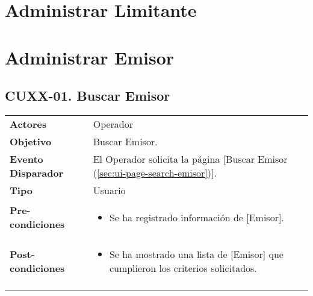 	\section{Administrar Limitante} \label{sec:cf-uc-admin-limitante}
	
	\clearpage
	\section{Administrar Emisor} \label{sec:cf-uc-admin-emisor}
	
	\subsection{CUXX-01. Buscar Emisor} \label{sec:cu-search-Emisor}
	
	\begin{tabular}{ p{3.5cm} p{11.5cm} }
		\textbf{Actores} & Operador\\
		\textbf{Objetivo} & Buscar Emisor.\\
		\textbf{Evento Disparador} & El Operador solicita la p\'agina [Buscar Emisor (\ref{sec:ui-page-search-emisor})].\\
		\textbf{Tipo} & Usuario\\
		\textbf{Pre-condiciones} &
			\begin{minipage}[t]{0.6\textwidth}
			\begin{itemize}[noitemsep,nolistsep]
			\setlength{\itemindent}{-.5cm}
				\item Se ha registrado informaci\'on de [Emisor].
			\end{itemize}
			\end{minipage} \\
		\textbf{Post-condiciones} &
			\begin{minipage}[t]{0.6\textwidth}
			\begin{itemize}[noitemsep,nolistsep]
			\setlength{\itemindent}{-.5cm}
				\item Se ha mostrado una lista de [Emisor] que cumplieron los criterios solicitados.
			\end{itemize}
			\end{minipage} \\
		\\
	\end{tabular}
	
